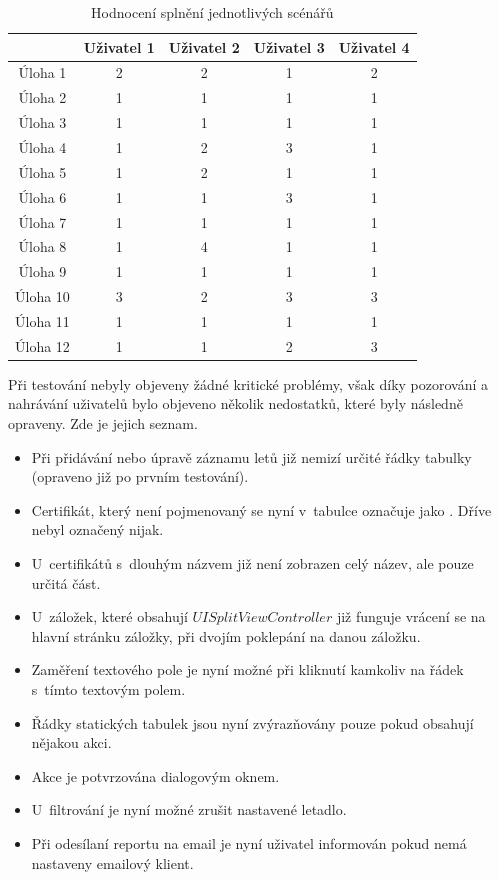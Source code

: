 \documentclass[thesis=M,czech]{FITthesis}[2012/06/26]
\begin{document}
\begin{table}\centering
 \begin{tabular}{ c | c | c | c | c |}
 	 & Uživatel 1 & Uživatel 2 & Uživatel 3 & Uživatel 4 \\
 	\hline
 	Úloha 1  & 2 & 2 & 1 & 2 \\
 	Úloha 2  & 1 & 1 & 1 & 1 \\
 	Úloha 3  & 1 & 1 & 1 & 1 \\
 	Úloha 4  & 1 & 2 & 3 & 1 \\
 	Úloha 5  & 1 & 2 & 1 & 1 \\
 	Úloha 6  & 1 & 1 & 3 & 1 \\
 	Úloha 7  & 1 & 1 & 1 & 1 \\
 	Úloha 8  & 1 & 4 & 1 & 1 \\
 	Úloha 9  & 1 & 1 & 1 & 1 \\
 	Úloha 10 & 3 & 2 & 3 & 3 \\
 	Úloha 11 & 1 & 1 & 1 & 1 \\
 	Úloha 12 & 1 & 1 & 2 & 3 \\
 \end{tabular}
 \caption[Hodnocení splnění jednotlivých scénářů]{Hodnocení splnění jednotlivých scénářů}\label{tab:ut_eval}
\end{table}

Při testování nebyly objeveny žádné kritické problémy, však díky pozorování a nahrávání uživatelů bylo objeveno několik nedostatků, které byly následně opraveny. Zde je jejich seznam.

\begin{itemize}
\item Při přidávání nebo úpravě záznamu letů již nemizí určité řádky tabulky (opraveno již po prvním testování).
\item Certifikát, který není pojmenovaný se nyní v~tabulce označuje jako . Dříve nebyl označený nijak.
\item U~certifikátů s~dlouhým názvem již není zobrazen celý název, ale pouze určitá část.
\item U~záložek, které obsahují $UISplitViewController$ již funguje vrácení se na hlavní stránku záložky, při dvojím poklepání na danou záložku.
\item Zaměření textového pole je nyní možné při kliknutí kamkoliv na řádek s~tímto textovým polem.
\item Řádky statických tabulek jsou nyní zvýrazňovány pouze pokud obsahují nějakou akci.
\item Akce  je potvrzována dialogovým oknem.
\item U~filtrování je nyní možné zrušit nastavené letadlo.
\item Při odesílaní reportu na email je nyní uživatel informován pokud nemá nastaveny emailový klient.
\end{itemize}
\end{document}
